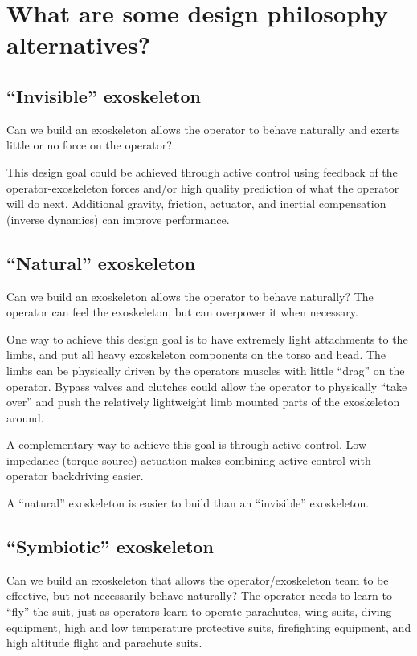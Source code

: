 \section{What are some design philosophy alternatives?}

\subsection{``Invisible'' exoskeleton}

Can we build an exoskeleton allows the operator to behave naturally
and exerts little or no force on the operator?

This design goal
could be achieved through active control using feedback of the
operator-exoskeleton forces and/or high quality prediction of what
the operator will do next. Additional gravity, friction, actuator, and
inertial compensation (inverse dynamics) can improve performance.

\subsection{``Natural'' exoskeleton}

Can we build an exoskeleton allows the operator to behave naturally?
The operator can feel the exoskeleton, but can overpower it when necessary.

One way to achieve this design goal is to have extremely light attachments
to the limbs, and put all heavy exoskeleton components on the
torso and head. The limbs can be physically driven by the operators muscles
with little ``drag'' on the operator.
Bypass valves and clutches could allow the operator to physically ``take over''
and push the relatively lightweight limb mounted parts of the exoskeleton around.

A complementary way to achieve this goal is through active control. Low impedance
(torque source) actuation makes combining active control with operator backdriving
easier.

A ``natural'' exoskeleton is easier to build than 
an ``invisible'' exoskeleton.

\subsection{``Symbiotic'' exoskeleton}

Can we build an exoskeleton that allows the operator/exoskeleton team
to be effective, but not necessarily behave naturally? 
The operator needs to learn to ``fly'' the suit,
just as operators learn to operate parachutes,
wing suits, diving equipment, high and low temperature protective
suits, firefighting equipment, and high altitude flight
and parachute suits.

